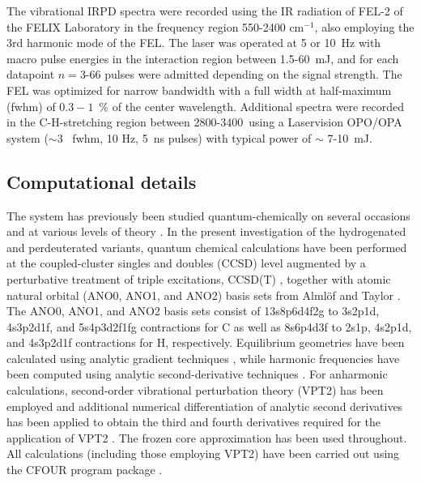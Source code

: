 The vibrational IRPD spectra were recorded using the IR radiation of FEL-2 of the FELIX Laboratory in the frequency region 550-2400 cm$^{-1}$, also employing the 3rd harmonic mode of the FEL. The laser was operated at 5 or 10~Hz with macro pulse energies in the interaction region between 1.5-60~mJ, and for each datapoint $n=$3-66 pulses were admitted depending on the signal strength. The FEL was optimized for narrow bandwidth with a full width at half-maximum (fwhm) of $0.3-1$~\% of the center wavelength. Additional spectra were recorded in the C-H-stretching region between 2800-3400~\wn using a Laservision OPO/OPA system ($\sim 3$ \wn\ fwhm, 10 Hz, 5~ns pulses) with typical power of $\sim$ 7-10~mJ.\\



\subsection{Computational details} 
\vspace{0.5cm}

The \iso  system has previously been studied quantum-chemically on several occasions
and at various levels of theory  \citep{HTL2011,BOR2011,BO2011,Botschwina2011}.
In the present investigation of the hydrogenated and perdeuterated variants, quantum chemical calculations have been performed 
at the coupled-cluster singles and doubles (CCSD) level 
augmented by a perturbative treatment of triple excitations, CCSD(T) \cite{raghavachari_chemphyslett_157_479_1989}, 
together with atomic natural orbital (ANO0, ANO1, and ANO2) basis sets from
Alml\"of and Taylor \cite{almlof_JCP_86_4070_1987}. The ANO0, ANO1, and ANO2 basis sets consist of 13s8p6d4f2g to 3s2p1d, 4s3p2d1f, and 5s4p3d2f1fg contractions for C as well as 8s6p4d3f to 2s1p, 4s2p1d, and 4s3p2d1f contractions for H, respectively. Equilibrium geometries have been calculated using analytic gradient techniques
\cite{watts_chemphyslett_200_1-2_1_1992}, while
harmonic frequencies have been computed using analytic second-derivative techniques
\cite{gauss_chemphyslett_276_70_1997,stanton_IntRevPhysChem_19_61_2000}.
For anharmonic calculations, second-order vibrational perturbation theory (VPT2) \cite{mills_alphas}   
has been employed and additional numerical differentiation of analytic second derivatives has been applied 
to obtain the third and fourth derivatives required for the application of VPT2  \cite{stanton_IntRevPhysChem_19_61_2000,stanton_JCP_108_7190_1998}.
The frozen core approximation has been used throughout.
All calculations (including those employing VPT2) have been carried out using the CFOUR program package \cite{cfour_JCP_2020,harding_parallel_2008}. \\

